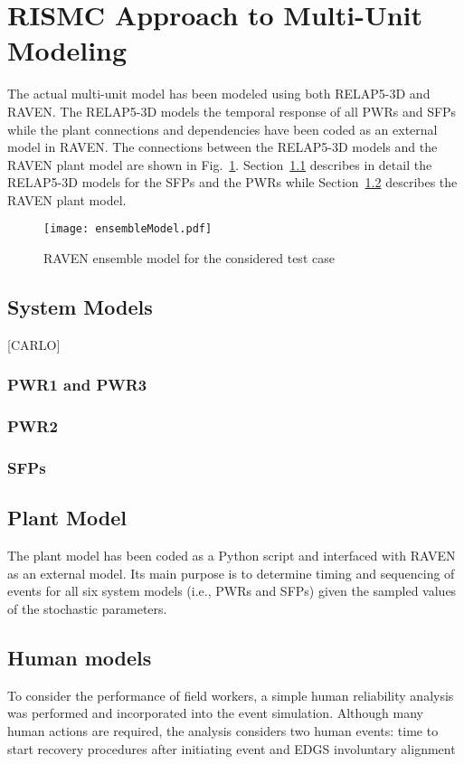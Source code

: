 \section{RISMC Approach to Multi-Unit Modeling}
\label{sec:RISMC_MU_modeling}

The actual multi-unit model has been modeled using both RELAP5-3D and RAVEN.
The RELAP5-3D models the temporal response of all PWRs and SFPs while the plant 
connections and dependencies have been coded as an external model in RAVEN.
The connections between the RELAP5-3D models and the RAVEN plant model are 
shown in Fig.~\ref{fig:ensembleModel}.
Section~\ref{sec:systemModels} describes in detail the RELAP5-3D models for 
the SFPs and the PWRs while Section~\ref{sec:plantModel} describes the RAVEN plant model.
 
\begin{figure}
    \centering
    \texttt{[image: ensembleModel.pdf]}
    \caption{RAVEN ensemble model for the considered test case}
    \label{fig:ensembleModel}
\end{figure}

\subsection{System Models}
\label{sec:systemModels}
[CARLO]
\subsubsection{PWR1 and PWR3}

\subsubsection{PWR2}

\subsubsection{SFPs}

\subsection{Plant Model}
\label{sec:plantModel}
The plant model has been coded as a Python script and interfaced with RAVEN as an 
external model. Its main purpose is to determine timing and sequencing of events 
for all six system models (i.e., PWRs and SFPs) given the sampled values of the 
stochastic parameters.

\subsection{Human models}
To consider the performance of field workers, a simple human reliability analysis was 
performed and incorporated into the event simulation. Although many human actions are 
required, the analysis considers two human events: time to start recovery procedures 
after initiating event and EDGS involuntary alignment

